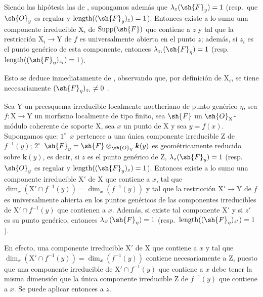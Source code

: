 \begin{corollary}[15.1.2]
\label{IV.15.1.2}
Siendo las hipótesis las de , supongamos además que $\lambda_z(\sh{F}_y)=1$ \textup{(resp.}~que $\sh{O}_y$ es regular y $\operatorname{length}((\sh{F}_y)_z)=1$\textup{)}.
Entonces existe a lo sumo una componente irreducible $\mathrm{X}_i$ de $\operatorname{Supp}(\sh{F})$ que contiene a $z$ y tal que la restricción $\mathrm{X}_i\to\mathrm{Y}$ de $f$ es universalmente abierta en el punto $z$; además, si $z_i$ es el punto genérico de esta componente, entonces $\lambda_{z_i}(\sh{F}_\eta)=1$ \textup{(resp.~$\operatorname{length}((\sh{F}_\eta)_{z_i})=1$)}.
\end{corollary}

Esto se deduce inmediatamente de , observando que, por definición de $\mathrm{X}_i$, se tiene necesariamente $(\sh{F}_\eta)_{z_i}\neq 0$ .

\begin{corollary}[15.1.3]
\label{IV.15.1.3}
Sea $\mathrm{Y}$ un preesquema irreducible localmente noetheriano de punto genérico $\eta$, sea $f:\mathrm{X}\to\mathrm{Y}$ un morfismo localmente de tipo finito, sea $\sh{F}$ un $\sh{O}_\mathrm{X}$-módulo coherente de soporte $\mathrm{X}$, sea $x$ un punto de $\mathrm{X}$ y sea $y=f(x)$.
Supongamos que: $1^\circ$~$x$ pertenece a una única componente irreducible $\mathrm{Z}$ de $f^{-1}(y)$; $2^\circ$~$\sh{F}_y=\sh{F}\otimes_{\sh{O}_\mathrm{Y}}\boldsymbol{k}(y)$ es geométricamente reducido sobre $\boldsymbol{k}(y)$, es decir, si $z$ es el punto genérico de $\mathrm{Z}$, $\lambda_z(\sh{F}_y)=1$ \textup{(resp.}~$\sh{O}_y$ es regular y $\operatorname{length}((\sh{F}_y)_z)=1$\textup{)}.
Entonces existe a lo sumo una componente irreducible $\mathrm{X}'$ de $\mathrm{X}$ que contiene a $x$, tal que $\dim_x(\mathrm{X}'\cap f^{-1}(y))=\dim_x(f^{-1}(y))$ y tal que la restricción $\mathrm{X}'\to\mathrm{Y}$ de $f$ es universalmente abierta en los puntos genéricos de las componentes irreducibles de $\mathrm{X}'\cap f^{-1}(y)$ que contienen a $x$.
Además, si existe tal componente $\mathrm{X}'$ y si $z'$ es su punto genérico, entonces $\lambda_{z'}(\sh{F}_\eta)=1$ \textup{(resp.~$\operatorname{length}((\sh{F}_\eta)_{z'})=1$)}.
\end{corollary}

En efecto, una componente irreducible $\mathrm{X}'$ de $\mathrm{X}$ que contiene a $x$ y tal que $\dim_x(\mathrm{X}'\cap f^{-1}(y))=\dim_x(f^{-1}(y))$ contiene necesariamente a $\mathrm{Z}$, puesto que una componente irreducible de $\mathrm{X}'\cap f^{-1}(y)$ que contiene a $x$ debe tener la misma dimensión que la única componente irreducible $\mathrm{Z}$ de $f^{-1}(y)$ que contiene a $x$.
Se puede aplicar entonces  a $z$.

